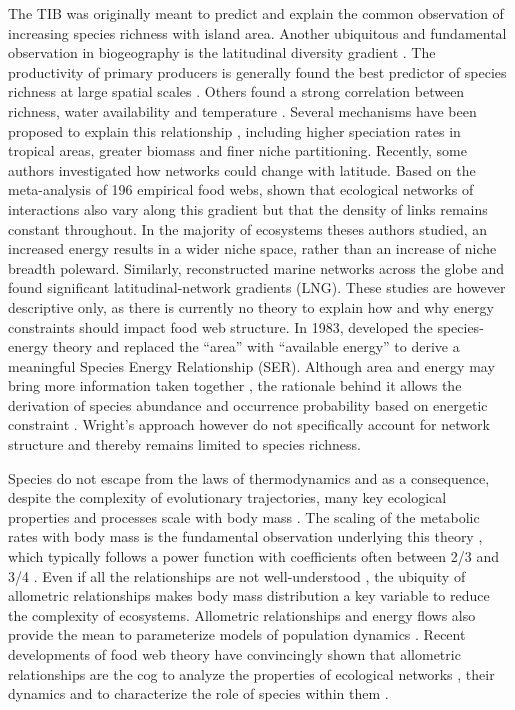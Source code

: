 The TIB was originally meant to predict and explain the common
observation of increasing species richness with island area. Another
ubiquitous and fundamental observation in biogeography is the
latitudinal diversity gradient
\citep[LDG,][]{Rhode1992, Stevens1989, Evans2005}. The productivity of
primary producers is generally found the best predictor of species
richness at large spatial scales \citep{Evans2005, Storch2005}. Others
found a strong correlation between richness, water availability and
temperature \citep{Currie1993, Hawkins2003}. Several mechanisms have
been proposed to explain this relationship \citep[see][ for a
review]{Currie2004, Evans2005}, including higher speciation rates in
tropical areas, greater biomass and finer niche partitioning. Recently,
some authors investigated how networks could change with latitude. Based
on the meta-analysis of 196 empirical food webs, \citet{Cirtwill2015a}
shown that ecological networks of interactions also vary along this
gradient but that the density of links remains constant throughout. In
the majority of ecosystems theses authors studied, an increased energy
results in a wider niche space, rather than an increase of niche breadth
poleward. Similarly, \citet{Albouy2016} reconstructed marine networks
across the globe and found significant latitudinal-network gradients
(LNG). These studies are however descriptive only, as there is currently
no theory to explain how and why energy constraints should impact food
web structure. In 1983, \citet{Wright1983} developed the species-energy
theory and replaced the ``area'' with ``available energy'' to derive a
meaningful Species Energy Relationship (SER). Although area and energy
may bring more information taken together \citep{Storch2005}, the
rationale behind it allows the derivation of species abundance and
occurrence probability based on energetic constraint \citep{Wright1983}.
Wright's approach however do not specifically account for network
structure and thereby remains limited to species richness.

Species do not escape from the laws of thermodynamics and as a
consequence, despite the complexity of evolutionary trajectories, many
key ecological properties and processes scale with body mass
\citep[\emph{i.e.} metabolic theory of
ecology][]{Brown2004, Woodward2005a}. The scaling of the metabolic rates
with body mass is the fundamental observation underlying this theory
\citep{Gillooly2001}, which typically follows a power function with
coefficients often between 2/3 and 3/4 \citep{White2013}. Even if all
the relationships are not well-understood \citetext{\citealp[see the
case of abundances reviewed in][]{White2007}; \citealp[and the recent
relationship between prey and predator biomasses][]{Hatton2015}}, the
ubiquity of allometric relationships makes body mass distribution a key
variable to reduce the complexity of ecosystems. Allometric
relationships and energy flows also provide the mean to parameterize
models of population dynamics \citep{Yodzis1992}. Recent developments of
food web theory have convincingly shown that allometric relationships
are the cog to analyze the properties of ecological networks
\citep{Gravel2013, Petchey2008}, their dynamics \citep{Brose2006} and to
characterize the role of species within them \citep{Schneider2012}.

